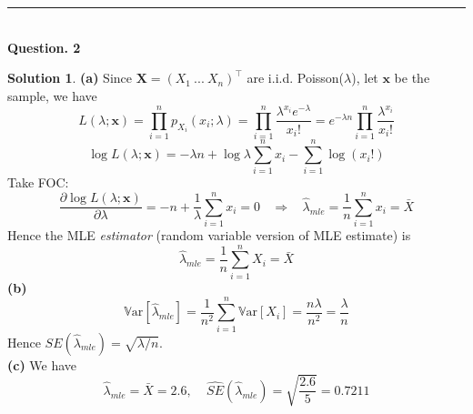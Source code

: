 \documentclass[a4paper, 10pt]{article}
\theoremstyle{definition}
\theoremstyle{hSol}
\newtheorem*{solution}{Solution}
\begin{document}
\noindent\rule{16cm}{0.4pt}
~\\
\textbf{Question. 2}
\begin{solution} \textbf{(a)} Since $\bm{X}= (X_1~...~X_n)^{\top}$ are i.i.d. Poisson($\lambda$), let $\bm{x}$ be the sample, we have
\begin{equation}
  L(\lambda; \bm{x}) = \prod_{i=1}^n p_{X_i}(x_i;\lambda) = \prod_{i=1}^n \frac{\lambda^{x_i}e^{-\lambda}}{x_i!} = e^{-\lambda n} \prod_{i=1}^n \frac{\lambda^{x_i}}{x_i !}
\end{equation}
\begin{equation}
  \log L(\lambda ; \bm{x}) = -\lambda n + \log \lambda \sum_{i=1}^n x_i -\sum_{i=1}^n \log(x_i!)
\end{equation}
Take FOC: 
\begin{equation}
  \frac{\partial \log L(\lambda; \bm{x})}{\partial \lambda} = -n + \frac{1}{\lambda} \sum_{i=1}^n x_i = 0~~~~\Rightarrow~~~~ \hat{\lambda}_{mle} = \frac{1}{n}\sum_{i=1}^n x_i = \bar{X}
\end{equation}
Hence the MLE \textit{estimator} (random variable version of MLE estimate) is 
$$
\hat{\lambda}_{mle} = \frac{1}{n}\sum_{i=1}^n X_i = \bar{X}
$$
\textbf{(b)}
\begin{equation}
  \mathrm{\mathbb{V}ar}\left[\hat{\lambda}_{mle}\right] = \frac{1}{n^2} \sum_{i=1}^n \mathrm{\mathbb{V}ar}\left[X_i\right] = \frac{n\lambda}{n^2} = \frac{\lambda}{n}
\end{equation}
Hence $SE(\hat{\lambda}_{mle}) = \sqrt{\lambda / n}$. \\
\textbf{(c)} We have
\begin{equation}
  \hat{\lambda}_{mle} = \bar{X} = 2.6,~~~~~\hat{SE}(\hat{\lambda}_{mle}) = \sqrt{\frac{2.6}{5}} = 0.7211
\end{equation}
\end{solution}
\end{document}

